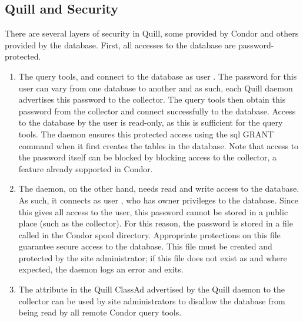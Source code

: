 \subsection{\label{sec:Quill-Security}Quill and Security}

There are several layers of security in Quill, some provided by Condor and
others provided by the database.  First, all accesses to the database
are password-protected.

\begin{enumerate}
\item The query tools,  and
 connect to the database as user .
The password for this user can vary from one database to another and
as such, each Quill daemon advertises this password to the collector.
The query tools then obtain this password from the collector and
connect successfully to the database.  Access to the database by the
 user is read-only, as this is sufficient for the
query tools.  The  daemon ensures this protected access using the sql
GRANT command when it first creates the tables in the database.  Note that
access to the  password itself can be blocked by
blocking access to the collector, a feature already supported in Condor.

\item The  daemon, on the other hand, needs read and write access
to the database.  As such, it connects as user ,
who has owner privileges to the database.  Since this gives all
access to the  user, this password cannot
be stored in a public place (such as the collector).  For this
reason, the  password is stored in a file called
 in the Condor spool directory.
Appropriate protections on this file guarantee secure access to the database.
This file must be created and protected by the site administrator;
if this file does not exist as and where expected, the 
daemon logs an error and exits.

\item The  attribute in the Quill ClassAd advertised
by the Quill daemon to the collector can be used by site administrators
to disallow the database from being read by all remote Condor query tools.

\end{enumerate}

